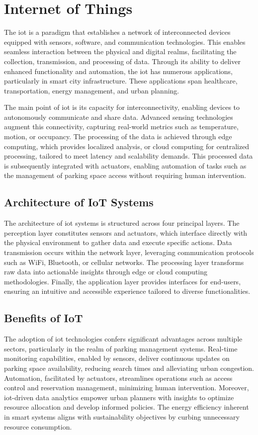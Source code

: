 \chapter{Internet of Things}\label{iot}

The \gls{iot} is a paradigm that establishes a network of interconnected devices equipped with sensors, software, and communication technologies. This enables seamless interaction between the physical and digital realms, facilitating the collection, transmission, and processing of data. Through its ability to deliver enhanced functionality and automation, the \gls{iot} has numerous applications, particularly in smart city infrastructure. These applications span healthcare, transportation, energy management, and urban planning.

The main point of \gls{iot} is its capacity for interconnectivity, enabling devices to autonomously communicate and share data. Advanced sensing technologies augment this connectivity, capturing real-world metrics such as temperature, motion, or occupancy. The processing of the data is achieved through edge computing, which provides localized analysis, or cloud computing for centralized processing, tailored to meet latency and scalability demands. This processed data is subsequently integrated with actuators, enabling automation of tasks such as the management of parking space access without requiring human intervention.

\section{Architecture of IoT Systems}
The architecture of \gls{iot} systems is structured across four principal layers. The perception layer constitutes sensors and actuators, which interface directly with the physical environment to gather data and execute specific actions. Data transmission occurs within the network layer, leveraging communication protocols such as \gls{WiFi}, \gls{Bluetooth}, or cellular networks. The processing layer transforms raw data into actionable insights through edge or cloud computing methodologies. Finally, the application layer provides interfaces for end-users, ensuring an intuitive and accessible experience tailored to diverse functionalities.

\section{Benefits of IoT}
The adoption of \gls{iot} technologies confers significant advantages across multiple sectors, particularly in the realm of parking management systems. Real-time monitoring capabilities, enabled by sensors, deliver continuous updates on parking space availability, reducing search times and alleviating urban congestion. Automation, facilitated by actuators, streamlines operations such as access control and reservation management, minimizing human intervention. Moreover, \gls{iot}-driven data analytics empower urban planners with insights to optimize resource allocation and develop informed policies. The energy efficiency inherent in smart systems aligns with sustainability objectives by curbing unnecessary resource consumption.


